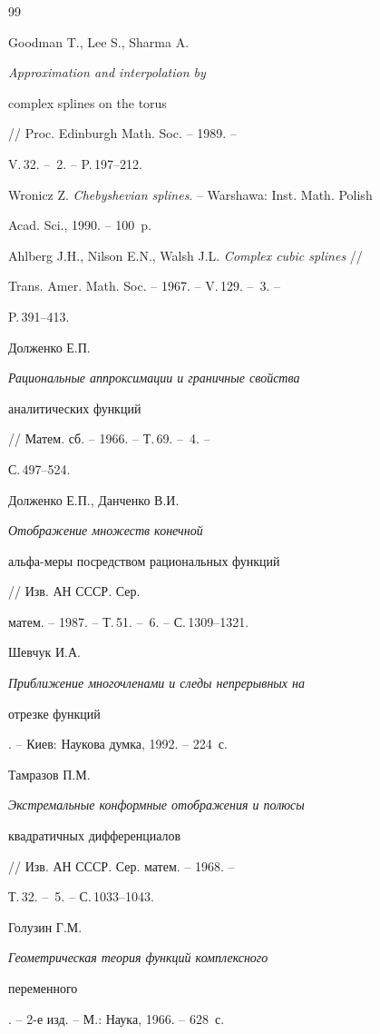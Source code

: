 \begin{thebibliography}{99}







Goodman T., Lee S., Sharma A. {\em Approximation and interpolation by


complex splines on the torus} // Proc. Edinburgh Math. Soc. -- 1989. --


V.\,32. -- \No\,2. -- P.\,197--212.




Wronicz Z. {\em Chebyshevian splines}. -- Warshawa: Inst. Math. Polish


Acad. Sci., 1990. -- 100~p.




Ahlberg J.H., Nilson E.N., Walsh J.L. {\em Complex cubic splines} //


Trans. Amer. Math. Soc. -- 1967. -- V.\,129. -- \No\,3. --


P.\,391--413.




Долженко Е.П. {\em Рациональные аппроксимации и граничные свойства


аналитических функций} // Матем. сб. -- 1966. -- Т.\,69. -- \No\,4. --


С.\,497--524.




Долженко Е.П., Данченко В.И. {\em Отображение множеств конечной


альфа-меры посредством рациональных функций} // Изв. АН СССР. Сер.


матем. -- 1987. -- Т.\,51. -- \No\,6. -- С.\,1309--1321.




Шевчук И.А. {\em Приближение многочленами и следы непрерывных на


отрезке функций}. -- Киев: Наукова думка, 1992. -- 224~с.




Тамразов П.М. {\em Экстремальные конформные отображения и полюсы


квадратичных дифференциалов} // Изв. АН СССР. Сер. матем. -- 1968. --


Т.\,32. -- \No\,5. -- С.\,1033--1043.




Голузин Г.М. {\em Геометрическая теория функций комплексного


переменного}. -- 2-е изд. -- М.: Наука, 1966. -- 628~с.



\end{thebibliography}
